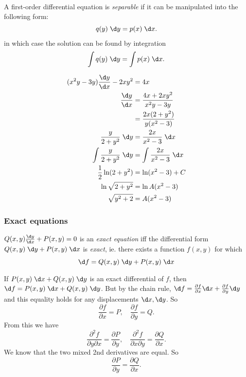 \documentclass[a4paper]{article}
\begin{document}
  \begin{defi}
    A first-order differential equation is \emph{separable} if it can be manipulated into the following form:
    \[
      q(y) \;\d y = p(x) \;\d x.
    \]
    in which case the solution can be found by integration
    \[
      \int q(y)\;\d y = \int p(x)\; \d x.
    \]
  \end{defi}

  \begin{eg}
    \begin{align*}
      (x^2y - 3y)\frac{\d y}{\d x} - 2xy^2 &= 4x\\
      \frac{\d y}{\d x} &= \frac{4x + 2xy^2}{x^2y - 3y}\\
      &= \frac{2x(2 +  y^2)}{y(x^2 - 3)}\\
      \frac{y}{2 + y^2}\; \d y &= \frac{2x}{x^2 - 3}\;\d x\\
      \int \frac{y}{2 + y^2}\; \d y &= \int\frac{2x}{x^2 - 3}\;\d x\\
      \frac{1}{2}\ln(2 + y^2) &= \ln (x^2 - 3) + C\\
      \ln \sqrt{2 + y^2} &= \ln A(x^2 - 3)\\
      \sqrt{y^2 + 2} &= A(x^2 - 3)
    \end{align*}
  \end{eg}
  \subsubsection{Exact equations}
  \begin{defi}
    $Q(x, y)\frac{\d y}{\d x} + P(x, y) = 0$ is an \emph{exact equation} iff the differential form $Q(x, y)\;\d y + P(x, y)\;\d x$ is \emph{exact}, ie. there exists a function $f(x, y)$ for which 
    \[
      \d f = Q(x, y)\;\d y + P(x, y)\;\d x
    \]
  \end{defi}

  If $P(x, y)\;\d x + Q(x, y)\;\d y$ is an exact differential of $f$, then $\d f = P(x, y) \;\d x + Q(x, y)\;\d y$. But by the chain rule, $\d f  = \frac{\partial f}{\partial x}\d x + \frac{\partial f}{\partial y}\d y$ and this equality holds for any displacements $\d x, \d y$. So
  \[
    \frac{\partial f}{\partial x} = P,\quad\frac{\partial f}{\partial y} = Q.
  \]
  From this we have
  \[
    \frac{\partial^2 f}{\partial y\partial x} = \frac{\partial P}{\partial y},\quad\frac{\partial^2 f}{\partial x \partial y} = \frac{\partial Q}{\partial x}.
  \]
  We know that the two mixed 2nd derivatives are equal. So
  \[
    \frac{\partial P}{\partial y} = \frac{\partial Q}{\partial x}.
  \]
\end{document}
